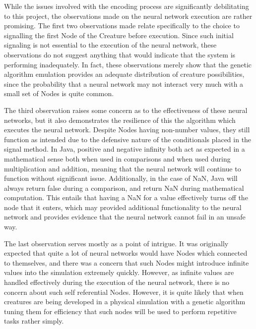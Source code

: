 \documentclass[12pt]{article}
\begin{document}
While the issues involved with the encoding process are significantly debilitating to this project, the observations made on the neural network execution are rather promising.
The first two observations made relate specifically to the choice to signalling the first Node of the Creature before execution.
Since such initial signaling is not essential to the execution of the neural network, these observations do not suggest anything that would indicate that the system is performing inadequately.
In fact, these observations merely show that the genetic algorithm emulation provides an adequate distribution of creature possibilities, since the probability that a neural network may not interact very much with a small set of Nodes is quite common.

The third observation raises some concern as to the effectiveness of these neural networks, but it also demonstrates the resilience of this the algorithm which executes the neural network.
Despite Nodes having non-number values, they still function as intended due to the defensive nature of the conditionals placed in the signal method.
In Java, positive and negative infinity both act as expected in a mathematical sense both when used in comparisons and when used during multiplication and addition, meaning that the neural network will continue to function without significant issue.
Additionally, in the case of NaN, Java will always return false during a comparison, and return NaN during mathematical computation. This entails that having a NaN for a value effectively turns off the node that it enters, which may provided additional functionality to the neural network and provides evidence that the neural network cannot fail in an unsafe way.

The last observation serves mostly as a point of intrigue.
It was originally expected that quite a lot of neural networks would have Nodes which connected to themselves, and there was a concern that such Nodes might introduce infinite values into the simulation extremely quickly.
However, as infinite values are handled effectively during the execution of the neural network, there is no concern about such self referential Nodes.
However, it is quite likely that when creatures are being developed in a physical simulation with a genetic algorithm tuning them for efficiency that such nodes will be used to perform repetitive tasks rather simply.
\end{document}
